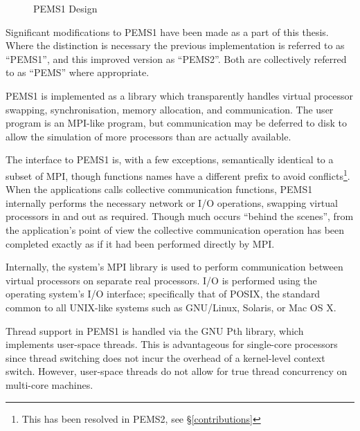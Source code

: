 \documentclass[12pt]{carletoncsthesis}
\begin{document}
\begin{figure}[ht]
\begin{center}
\caption{PEMS1 Design}
\label{pems1_design}
\end{center}
\end{figure}

Significant modifications to PEMS1 have been made as a part of this thesis.
Where the distinction is necessary the previous implementation is referred to
as ``PEMS1'', and this improved version as ``PEMS2''.  Both are collectively
referred to as ``PEMS'' where appropriate.

PEMS1 is implemented as a library which transparently handles virtual
processor swapping, synchronisation, memory allocation, and communication.
The user program is an MPI-like program, but communication may be deferred
to disk to allow the simulation of more processors than are actually available.

The interface to PEMS1 is, with a few exceptions, semantically identical
to a subset of MPI, though functions names have a different prefix to avoid
conflicts\footnote{This has been resolved in PEMS2, see \S\ref{contributions}}.
When the applications calls collective communication functions, PEMS1
internally performs the necessary network or I/O operations, swapping virtual
processors in and out as required.  Though much occurs ``behind the scenes'',
from the application's point of view the collective communication operation
has been completed exactly as if it had been performed directly by MPI.

Internally, the system's MPI library is used to perform communication between
virtual processors on separate real processors.  I/O is performed using the
operating system's I/O interface; specifically that of POSIX, the standard
common to all UNIX-like systems such as GNU/Linux, Solaris, or Mac OS X.

Thread support in PEMS1 is handled via the GNU Pth library, which implements
user-space threads.  This is advantageous for single-core processors since
thread switching does not incur the overhead of a kernel-level context switch.
However, user-space threads do not allow for true thread concurrency on
multi-core machines.
\end{document}
